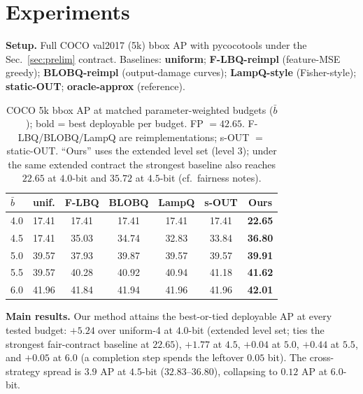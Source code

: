 \section{Experiments}
\label{sec:exp}

\noindent\textbf{Setup.}
Full COCO val2017 (5k) bbox AP with pycocotools under the
Sec.~\ref{sec:prelim} contract. Baselines: \textbf{uniform};
\textbf{F-LBQ-reimpl} (feature-MSE greedy); \textbf{BLOBQ-reimpl}
(output-damage curves); \textbf{LampQ-style} (Fisher-style);
\textbf{static-OUT}; \textbf{oracle-approx} (reference).

\begin{table}[t]
\centering
\small
\setlength{\tabcolsep}{3.5pt}
\caption{COCO 5k bbox AP at matched parameter-weighted budgets ($\bar b$);
bold = best deployable per budget. FP $=42.65$. F-LBQ/BLOBQ/LampQ are
  reimplementations; s-OUT $=$ static-OUT. ``Ours'' uses the extended level
  set (level $3$); under the same extended contract the strongest baseline
  also reaches $22.65$ at $4.0$-bit and $35.72$ at $4.5$-bit (cf.\ fairness
  notes).}
\label{tab:main}
\begin{tabular}{lcccccc}
\toprule
$\bar b$ & unif. & F-LBQ & BLOBQ & LampQ & s-OUT & \textbf{Ours} \\
\midrule
4.0 & 17.41 & 17.41 & 17.41 & 17.41 & 17.41 & \textbf{22.65} \\
4.5 & 17.41 & 35.03 & 34.74 & 32.83 & 33.84 & \textbf{36.80} \\
5.0 & 39.57 & 37.93 & 39.87 & 39.57 & 39.57 & \textbf{39.91} \\
5.5 & 39.57 & 40.28 & 40.92 & 40.94 & 41.18 & \textbf{41.62} \\
6.0 & 41.96 & 41.84 & 41.94 & 41.96 & 41.96 & \textbf{42.01} \\
\bottomrule
\end{tabular}
\end{table}

\noindent\textbf{Main results.}
Our method attains the best-or-tied deployable AP at every tested
budget: $+5.24$ over uniform-4 at $4.0$-bit (extended level set;
ties the strongest fair-contract baseline at $22.65$), $+1.77$ at $4.5$,
$+0.04$ at $5.0$, $+0.44$ at $5.5$,
and $+0.05$ at $6.0$ (a completion step spends the leftover $0.05$ bit).
The cross-strategy spread is $3.9$ AP at $4.5$-bit ($32.83$--$36.80$),
collapsing to $0.12$ AP at $6.0$-bit.


